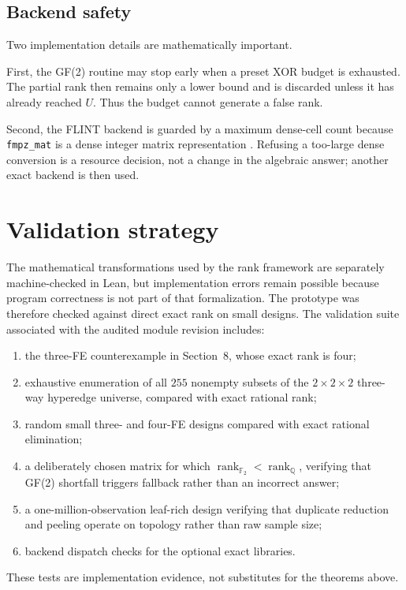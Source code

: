 \documentclass[11pt]{article}
\theoremstyle{definition}
\newcommand{\Q}{\mathbb{Q}}
\newcommand{\F}{\mathbb{F}}
\newcommand{\rank}{\operatorname{rank}}
\newcommand{\1}{\mathbf{1}}
\begin{document}
\subsection{Backend safety}

Two implementation details are mathematically important.

First, the GF(2) routine may stop early when a preset XOR budget is exhausted. The partial rank then remains only a lower bound and is discarded unless it has already reached $U$. Thus the budget cannot generate a false rank.

Second, the FLINT backend is guarded by a maximum dense-cell count because \texttt{fmpz\_mat} is a dense integer matrix representation \citep{FLINT2026}. Refusing a too-large dense conversion is a resource decision, not a change in the algebraic answer; another exact backend is then used.

\section{Validation strategy}

The mathematical transformations used by the rank framework are separately machine-checked in Lean, but implementation errors remain possible because program correctness is not part of that formalization. The prototype was therefore checked against direct exact rank on small designs. The validation suite associated with the audited module revision includes:
\begin{enumerate}[label=(\alph*)]
  \item the three-FE counterexample in Section~8, whose exact rank is four;
  \item exhaustive enumeration of all $255$ nonempty subsets of the $2\times2\times2$ three-way hyperedge universe, compared with exact rational rank;
  \item random small three- and four-FE designs compared with exact rational elimination;
  \item a deliberately chosen matrix for which $\rank_{\F_2}<\rank_{\Q}$, verifying that GF(2) shortfall triggers fallback rather than an incorrect answer;
  \item a one-million-observation leaf-rich design verifying that duplicate reduction and peeling operate on topology rather than raw sample size;
  \item backend dispatch checks for the optional exact libraries.
\end{enumerate}
These tests are implementation evidence, not substitutes for the theorems above.
\end{document}
